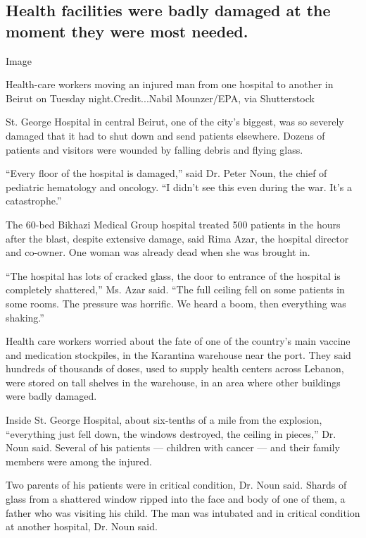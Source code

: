 \hypertarget{health-facilities-were-badly-damaged-at-the-moment-they-were-most-needed}{%
\subsection{Health facilities were badly damaged at the moment they were
most
needed.}\label{health-facilities-were-badly-damaged-at-the-moment-they-were-most-needed}}

Image

Health-care workers moving an injured man from one hospital to another
in Beirut on Tuesday night.Credit...Nabil Mounzer/EPA, via Shutterstock

St. George Hospital in central Beirut, one of the city's biggest, was so
severely damaged that it had to shut down and send patients elsewhere.
Dozens of patients and visitors were wounded by falling debris and
flying glass.

``Every floor of the hospital is damaged,'' said Dr. Peter Noun, the
chief of pediatric hematology and oncology. ``I didn't see this even
during the war. It's a catastrophe.''

The 60-bed Bikhazi Medical Group hospital treated 500 patients in the
hours after the blast, despite extensive damage, said Rima Azar, the
hospital director and co-owner. One woman was already dead when she was
brought in.

``The hospital has lots of cracked glass, the door to entrance of the
hospital is completely shattered,'' Ms. Azar said. ``The full ceiling
fell on some patients in some rooms. The pressure was horrific. We heard
a boom, then everything was shaking.''

Health care workers worried about the fate of one of the country's main
vaccine and medication stockpiles, in the Karantina warehouse near the
port. They said hundreds of thousands of doses, used to supply health
centers across Lebanon, were stored on tall shelves in the warehouse, in
an area where other buildings were badly damaged.

Inside St. George Hospital, about six-tenths of a mile from the
explosion, ``everything just fell down, the windows destroyed, the
ceiling in pieces,'' Dr. Noun said. Several of his patients --- children
with cancer --- and their family members were among the injured.

Two parents of his patients were in critical condition, Dr. Noun said.
Shards of glass from a shattered window ripped into the face and body of
one of them, a father who was visiting his child. The man was intubated
and in critical condition at another hospital, Dr. Noun said.

